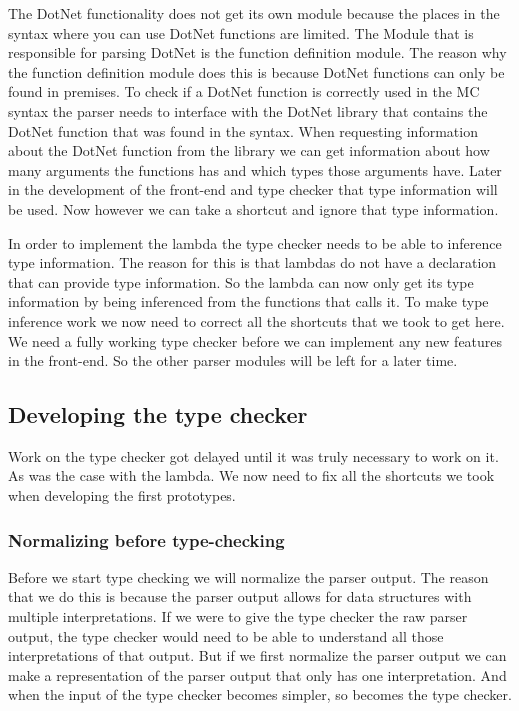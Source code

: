 The DotNet functionality does not get its own module because the places in the syntax where you can use DotNet functions are limited. The Module that is responsible for parsing DotNet is the function definition module. The reason why the function definition module does this is because DotNet functions can only be found in premises. To check if a DotNet function is correctly used in the MC syntax the parser needs to interface with the DotNet library that contains the DotNet function that was found in the syntax. When requesting information about the DotNet function from the library we can get information about how many arguments the functions has and which types those arguments have. Later in the development of the front-end and type checker that type information will be used. Now however we can take a shortcut and ignore that type information. 

In order to implement the lambda the type checker needs to be able to inference type information. The reason for this is that lambdas do not have a declaration that can provide type information. So the lambda can now only get its type information by being inferenced from the functions that calls it. To make type inference work we now need to correct all the shortcuts that we took to get here. We need a fully working type checker before we can implement any new features in the front-end. So the other parser modules will be left for a later time.

\subsection{Developing the type checker}
Work on the type checker got delayed until it was truly necessary to work on it. As was the case with the lambda. We now need to fix all the shortcuts we took when developing the first prototypes.

\subsubsection{Normalizing before type-checking}
Before we start type checking we will normalize the parser output. The reason that we do this is because the parser output allows for data structures with multiple interpretations. If we were to give the type checker the raw parser output, the type checker would need to be able to understand all those interpretations of that output. But if we first normalize the parser output we can make a representation of the parser output that only has one interpretation. And when the input of the type checker becomes simpler, so becomes the type checker.


